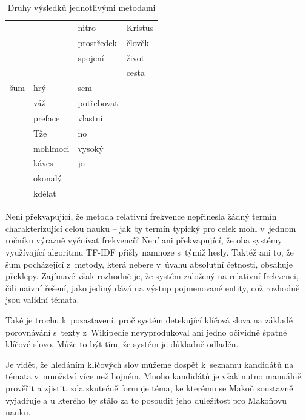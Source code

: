 \begin{table}[htpb]
\begin{center}
\begin{tabular}{|l|l|l|l|}
  	& 	& nitro	& Kristus \\
  	& 	& prostředek	& člověk \\
  	& 	& spojení	& život \\
  	& 	& 	& cesta \\
\hline
  šum 	& hrý	& sem	&  \\
   	& váž	& potřebovat	& \\
   	& preface	& vlastní	& \\
   	& Tže	& no	& \\
   	& mohlmoci	& vysoký	& \\
   	& káves	& jo	& \\
   	& okonalý	& 	& \\
   	& kdělat	& 	& \\
\hline
\end{tabular}
\caption{Druhy výsledků jednotlivými metodami}
\label{tab:topichits}
\end{center}
\end{table}

Není překvapující, že metoda relativní frekvence nepřinesla žádný termín
charakterizující celou nauku -- jak by termín typický pro celek mohl v~jednom
ročníku výrazně vyčnívat frekvencí? Není ani překvapující, že oba systémy
využívající algoritmu TF-IDF přišly namnoze s~týmiž hesly. Taktéž ani to, že šum
pocházející z~metody, která nebere v~úvahu absolutní četnosti, obsahuje
překlepy. Zajímavé však rozhodně je, že systém založený na relativní frekvenci,
čili naivní řešení, jako jediný dává na výstup pojmenované entity, což rozhodně
jsou validní témata.

Také je trochu k~pozastavení, proč systém detekující
klíčová slova na základě porovnávání s~texty z~Wikipedie nevyprodukoval ani
jedno očividně špatné klíčové slovo. Může to být tím, že systém je důkladně
odladěn.

Je vidět, že hledáním klíčových slov můžeme dospět k~seznamu kandidátů na témata
v~množství více než hojném. Mnoho kandidátů je však nutno
manuálně prověřit a zjistit, zda skutečně formuje téma, ke kterému se Makoň
soustavně vyjadřuje a u kterého by stálo za to posoudit jeho důležitost pro
Makoňovu nauku.




